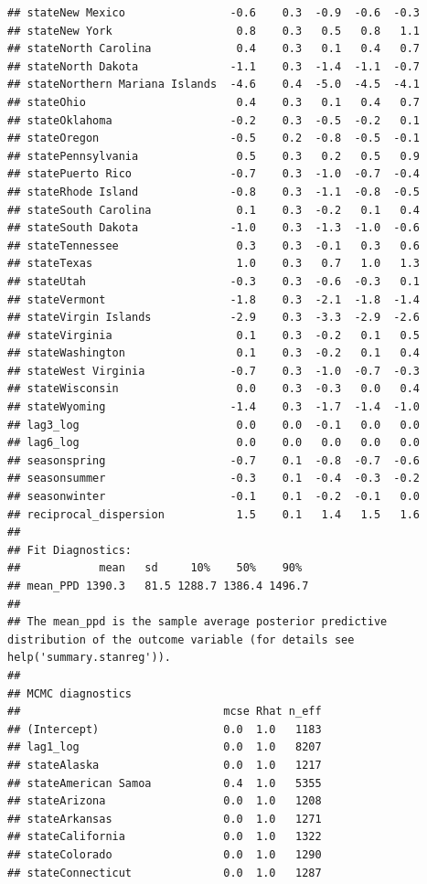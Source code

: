 \documentclass[
]{book}
\begin{document}
\begin{verbatim}
## stateNew Mexico                -0.6    0.3  -0.9  -0.6  -0.3
## stateNew York                   0.8    0.3   0.5   0.8   1.1
## stateNorth Carolina             0.4    0.3   0.1   0.4   0.7
## stateNorth Dakota              -1.1    0.3  -1.4  -1.1  -0.7
## stateNorthern Mariana Islands  -4.6    0.4  -5.0  -4.5  -4.1
## stateOhio                       0.4    0.3   0.1   0.4   0.7
## stateOklahoma                  -0.2    0.3  -0.5  -0.2   0.1
## stateOregon                    -0.5    0.2  -0.8  -0.5  -0.1
## statePennsylvania               0.5    0.3   0.2   0.5   0.9
## statePuerto Rico               -0.7    0.3  -1.0  -0.7  -0.4
## stateRhode Island              -0.8    0.3  -1.1  -0.8  -0.5
## stateSouth Carolina             0.1    0.3  -0.2   0.1   0.4
## stateSouth Dakota              -1.0    0.3  -1.3  -1.0  -0.6
## stateTennessee                  0.3    0.3  -0.1   0.3   0.6
## stateTexas                      1.0    0.3   0.7   1.0   1.3
## stateUtah                      -0.3    0.3  -0.6  -0.3   0.1
## stateVermont                   -1.8    0.3  -2.1  -1.8  -1.4
## stateVirgin Islands            -2.9    0.3  -3.3  -2.9  -2.6
## stateVirginia                   0.1    0.3  -0.2   0.1   0.5
## stateWashington                 0.1    0.3  -0.2   0.1   0.4
## stateWest Virginia             -0.7    0.3  -1.0  -0.7  -0.3
## stateWisconsin                  0.0    0.3  -0.3   0.0   0.4
## stateWyoming                   -1.4    0.3  -1.7  -1.4  -1.0
## lag3_log                        0.0    0.0  -0.1   0.0   0.0
## lag6_log                        0.0    0.0   0.0   0.0   0.0
## seasonspring                   -0.7    0.1  -0.8  -0.7  -0.6
## seasonsummer                   -0.3    0.1  -0.4  -0.3  -0.2
## seasonwinter                   -0.1    0.1  -0.2  -0.1   0.0
## reciprocal_dispersion           1.5    0.1   1.4   1.5   1.6
## 
## Fit Diagnostics:
##            mean   sd     10%    50%    90% 
## mean_PPD 1390.3   81.5 1288.7 1386.4 1496.7
## 
## The mean_ppd is the sample average posterior predictive distribution of the outcome variable (for details see help('summary.stanreg')).
## 
## MCMC diagnostics
##                               mcse Rhat n_eff
## (Intercept)                   0.0  1.0   1183
## lag1_log                      0.0  1.0   8207
## stateAlaska                   0.0  1.0   1217
## stateAmerican Samoa           0.4  1.0   5355
## stateArizona                  0.0  1.0   1208
## stateArkansas                 0.0  1.0   1271
## stateCalifornia               0.0  1.0   1322
## stateColorado                 0.0  1.0   1290
## stateConnecticut              0.0  1.0   1287

\end{verbatim}
\end{document}
